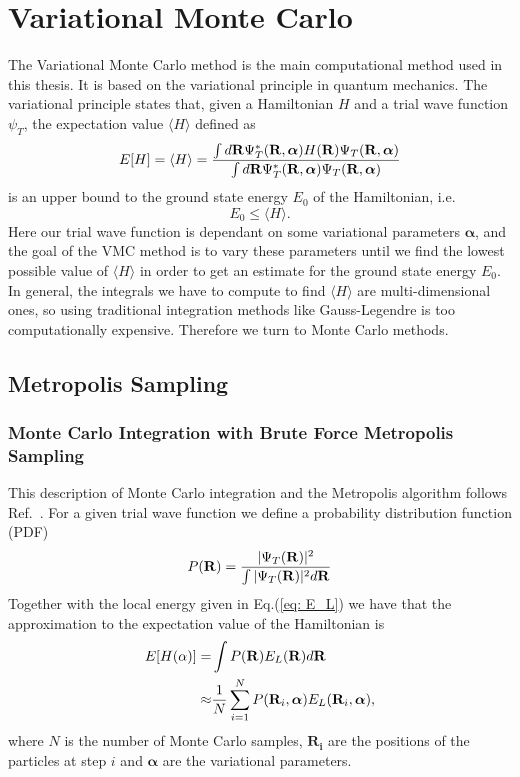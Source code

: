 \documentclass[../main.tex]{subfiles}
\begin{document}
\chapter{Variational Monte Carlo}\label{sec: VMC}

The Variational Monte Carlo method is the main computational method used in this thesis. It is based on the variational principle in quantum mechanics. The variational principle states that, given a Hamiltonian $H$ and a trial wave function $\psi_T$, the expectation value $\langle H \rangle$ defined as\cite{Griffiths}
\begin{equation}
 E[H] = \langle H \rangle =
 \frac{\int d {\bf R} \Psi_T^*({\bf R}, \boldsymbol{\alpha}) H({\bf R}) \Psi_T({\bf R}, \boldsymbol{\alpha})}
       {\int d {\bf R} \Psi_T^*({\bf R}, \boldsymbol{\alpha}) \Psi_T({\bf R}, \boldsymbol{\alpha})}
 \label{multidim}
\end{equation}
is an upper bound to the ground state energy $E_0$ of the Hamiltonian, i.e.
\begin{equation}
E_0 \leq \langle H \rangle.
\end{equation}
Here our trial wave function is dependant on some variational parameters $\boldsymbol{\alpha}$, and the goal of the VMC method is to vary these parameters until we find the lowest possible value of $\langle H\rangle$ in order to get an estimate for the ground state energy $E_0$. In general, the integrals we have to compute to find $\langle H\rangle$ are multi-dimensional ones, so using traditional integration methods like Gauss-Legendre is too computationally expensive. Therefore we turn to Monte Carlo methods.

\section{Metropolis Sampling}

\subsection{Monte Carlo Integration with Brute Force Metropolis Sampling}
This description of Monte Carlo integration and the Metropolis algorithm follows Ref.~\cite{FYS4411-Slides}.
For a given trial wave function we define a probability distribution function (PDF)
\begin{equation}
 P({\bf R}) = \frac{|\Psi_T({\bf R})|^2}{\int |\Psi_T({\bf R})|^2 d{\bf R}}
\end{equation}
Together with the local energy given in Eq.(\ref{eq: E_L}) we have that the approximation to the expectation value of the Hamiltonian is
\begin{align}
\begin{split}
E[H(\mathbf{\alpha})] =& \int P({\bf R}) E_L({\bf R}) d{\bf R}\\
\approx& \frac{1}{N} \sum_{i=1}^N P({\bf R}_i, \boldsymbol{\alpha}) E_L({\bf R}_i, \boldsymbol{\alpha}),
\end{split}
\end{align}
where $N$ is the number of Monte Carlo samples, $\mathbf{R_i}$ are the positions of the particles at step $i$ and $\boldsymbol{\alpha}$ are the variational parameters.
\end{document}
